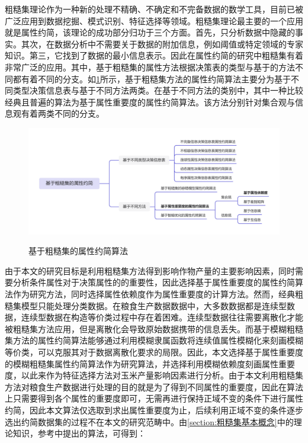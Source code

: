 粗糙集理论作为一种新的处理不精确、不确定和不完备数据的数学工具，目前已被广泛应用到数据挖掘、模式识别、特征选择等领域。粗糙集理论最主要的一个应用就是属性约简，该理论的成功部分归功于三个方面。首先，只分析数据中隐藏的事实。其次，在数据分析中不需要关于数据的附加信息，例如阈值或特定领域的专家知识。第三，它找到了数据的最小信息表示\cite{2009New}。因此在属性约简的研究中粗糙集有着非常广泛的应用。其中，基于粗糙集的属性方法根据决策表的类型与基于的方法不同都有着不同的分支。如\ref{fig:FuzzyRoughSetFeatureSelection}所示，基于粗糙集方法的属性约简算法主要分为基于不同类型决策信息表与基于不同方法两类。在基于不同方法的类别中，其中一种比较经典且普遍的算法为基于属性重要度的属性约简算法。该方法分别针对集合观与信息观有着两类不同的分支。

\begin{figure}[H]
    \centering
    \resizebox{\textwidth}{!}
    {
    \includegraphics{figs/FuzzyRoughSetFeatureSelection.png}
    }
    \caption{基于粗糙集的属性约简算法}
    \label{fig:FuzzyRoughSetFeatureSelection}
  \end{figure}


由于本文的研究目标是利用粗糙集方法得到影响作物产量的主要影响因素，同时需要分析条件属性对于决策属性的的重要性，因此选择基于属性重要度的属性约简算法作为研究方法，同时选择属性依赖度作为属性重要度的计算方法。然而，经典粗糙集模型只能处理分类数据\cite{2020Information,Jianhua2017Neighbor}。在粮食生产数据数据中，大多数数据都是连续型数据，连续型数据在构造等价类过程中存在着困难。连续型数据往往需要离散化才能被粗糙集方法应用，但是离散化会导致原始数据携带的信息丢失\cite{2022Deep}。而基于模糊粗糙集方法的属性约简算法能够通过利用模糊隶属函数将连续值属性模糊化来刻画模糊等价类，可以克服其对于数据离散化要求的局限。因此，本文选择基于属性重要度的模糊粗糙集属性约简算法作为研究算法，并选择利用模糊依赖度刻画属性重要度，以此来作为特征选择方法对玉米产量影响因素进行分析。由于本文利用粗糙集方法对粮食生产数据进行处理的目的就是为了得到不同属性的重要度，因此在算法上只需要得到各个属性的重要度即可，无需再进行保持正域不变的条件下进行属性约简，因此本文算法仅选取到求出属性重要度为止，后续利用正域不变的条件逐步选出约简数据集的过程不在本文的研究范畴中。由\ref{section:粗糙集基本概念}中的理论知识，参考\cite{基于粗糙集和模糊粗糙集的属性约简研究}中提出的算法，可得到：

